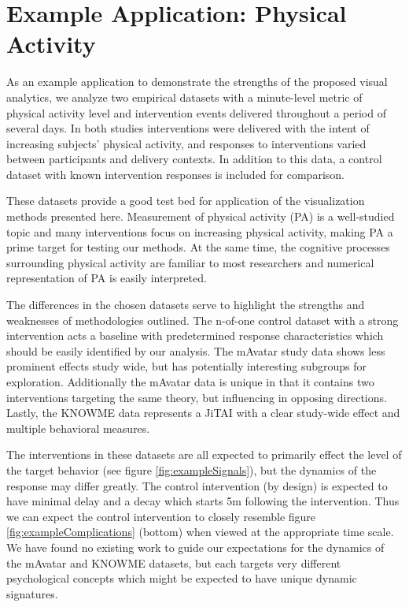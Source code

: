 \section{Example Application: Physical Activity}
As an example application to demonstrate the strengths of the proposed visual analytics, we analyze two empirical datasets with a minute-level metric of physical activity level and intervention events delivered throughout a period of several days.
In both studies interventions were delivered with the intent of increasing subjects’ physical activity, and responses to interventions varied between participants and delivery contexts.
In addition to this data, a control dataset with known intervention responses is included for comparison.

These datasets provide a good test bed for application of the visualization methods presented here.
Measurement of physical activity (PA) is a well-studied topic and many interventions focus on increasing physical activity, making PA a prime target for testing our methods.
At the same time, the cognitive processes surrounding physical activity are familiar to most researchers and numerical representation of PA is easily interpreted.

The differences in the chosen datasets serve to highlight the strengths and weaknesses of methodologies outlined. 
The n-of-one control dataset with a strong intervention acts a baseline with predetermined response characteristics which should be easily identified by our analysis.
The mAvatar study data shows less prominent effects study wide, but has potentially interesting subgroups for exploration.
Additionally the mAvatar data is unique in that it contains two interventions targeting the same theory, but influencing in opposing directions.
Lastly, the KNOWME data represents a JiTAI with a clear study-wide effect and multiple behavioral measures.

The interventions in these datasets are all expected to primarily effect the level of the target behavior (see figure \ref{fig:exampleSignals}), but the dynamics of the response may differ greatly. 
The control intervention (by design) is expected to have minimal delay and a decay which starts 5m following the intervention. 
Thus we can expect the control intervention to closely resemble figure \ref{fig:exampleComplications} (bottom) when viewed at the appropriate time scale.
We have found no existing work to guide our expectations for the dynamics of the mAvatar and KNOWME datasets, but each targets very different psychological concepts which might be expected to have unique dynamic signatures.

